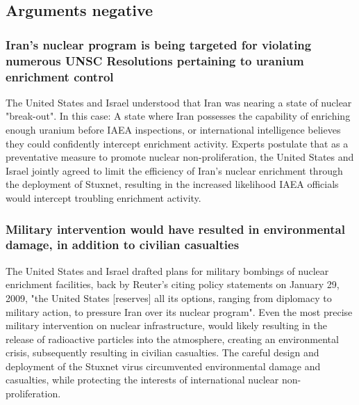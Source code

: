 \documentclass[12pt]{article}
\begin{document}
\begin{multicols}{2}
\subsection{Arguments negative}

\subsubsection{Iran's nuclear program is being targeted for violating numerous UNSC Resolutions pertaining to uranium enrichment control}

The United States and Israel understood that Iran was nearing a state of nuclear "break-out"\footnotemark[3]. In this case: A state where Iran possesses the capability of enriching enough uranium before IAEA inspections, or international intelligence believes they could confidently intercept enrichment activity. Experts postulate that as a preventative measure to promote nuclear non-proliferation, the United States and Israel jointly agreed to limit the efficiency of Iran's nuclear enrichment through the deployment of Stuxnet, resulting in the increased likelihood IAEA officials would intercept troubling enrichment activity.\cite{theRealStoryOfStuxnet}


\subsubsection{Military intervention would have resulted in environmental damage, in addition to civilian casualties}

The United States and Israel drafted plans for military bombings of nuclear enrichment facilities, back by Reuter's citing policy statements on January 29, 2009, "the United States [reserves] all its options, ranging from diplomacy to military action, to pressure Iran over its nuclear program".\cite{usOptionsForIran} Even the most precise military intervention on nuclear infrastructure, would likely resulting in the release of radioactive particles into the atmosphere, creating an environmental crisis, subsequently resulting in civilian casualties. The careful design and deployment of the Stuxnet virus circumvented environmental damage and casualties, while protecting the interests of international nuclear non-proliferation.




\end{multicols}
\end{document}
